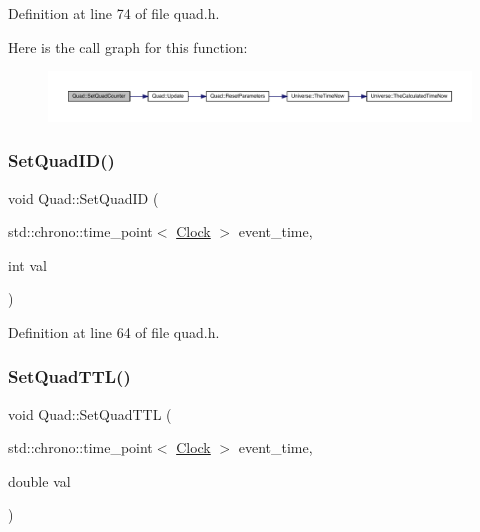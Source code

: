 Definition at line 74 of file quad.\+h.

Here is the call graph for this function\+:
\nopagebreak
\begin{figure}[H]
\begin{center}
\leavevmode
\includegraphics[width=350pt]{class_quad_a66ba58a32cf7b351e3e155efbdb46f8e_cgraph}
\end{center}
\end{figure}
\mbox{\label{class_quad_a9900acc75445ebc71aba2307e3fe0131}} 
\subsubsection{\texorpdfstring{Set\+Quad\+I\+D()}{SetQuadID()}}
{\footnotesize\ttfamily void Quad\+::\+Set\+Quad\+ID (\begin{DoxyParamCaption}\item[{std\+::chrono\+::time\+\_\+point$<$ \hyperlink{universe_8h_a0ef8d951d1ca5ab3cfaf7ab4c7a6fd80}{Clock} $>$}]{event\+\_\+time,  }\item[{int}]{val }\end{DoxyParamCaption})\hspace{0.3cm}{\ttfamily [inline]}}



Definition at line 64 of file quad.\+h.

\mbox{\label{class_quad_a4d3a52272d572315198623e836ac0a97}} 
\subsubsection{\texorpdfstring{Set\+Quad\+T\+T\+L()}{SetQuadTTL()}}
{\footnotesize\ttfamily void Quad\+::\+Set\+Quad\+T\+TL (\begin{DoxyParamCaption}\item[{std\+::chrono\+::time\+\_\+point$<$ \hyperlink{universe_8h_a0ef8d951d1ca5ab3cfaf7ab4c7a6fd80}{Clock} $>$}]{event\+\_\+time,  }\item[{double}]{val }\end{DoxyParamCaption})\hspace{0.3cm}{\ttfamily [inline]}}



